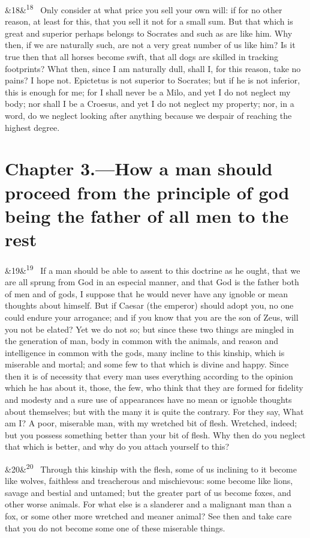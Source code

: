 \documentclass[12pt]{article}
\newcommand{\para}[1][]{\par\noindent\ifx&#1&\else\textsuperscript{\footnotesize #1}~\fi}
\begin{document}
\para[18] Only consider at what price you sell your own will: if for no other reason, at least for this, that you sell it not for a small sum. But that which is great and superior perhaps belongs to Socrates and such as are like him. Why then, if we are naturally such, are not a very great number of us like him? Is it true then that all horses become swift, that all dogs are skilled in tracking footprints? What then, since I am naturally dull, shall I, for this reason, take no pains? I hope not. Epictetus is not superior to Socrates; but if he is not inferior, this is enough for me; for I shall never be a Milo, and yet I do not neglect my body; nor shall I be a Croesus, and yet I do not neglect my property; nor, in a word, do we neglect looking after anything because we despair of reaching the highest degree.

\section*{Chapter 3.---How a man should proceed from the principle of god being the father of all men to the rest}

\para[19] If a man should be able to assent to this doctrine as he ought, that we are all sprung from God in an especial manner, and that God is the father both of men and of gods, I suppose that he would never have any ignoble or mean thoughts about himself. But if Caesar (the emperor) should adopt you, no one could endure your arrogance; and if you know that you are the son of Zeus, will you not be elated? Yet we do not so; but since these two things are mingled in the generation of man, body in common with the animals, and reason and intelligence in common with the gods, many incline to this kinship, which is miserable and mortal; and some few to that which is divine and happy. Since then it is of necessity that every man uses everything according to the opinion which he has about it, those, the few, who think that they are formed for fidelity and modesty and a sure use of appearances have no mean or ignoble thoughts about themselves; but with the many it is quite the contrary. For they say, What am I? A poor, miserable man, with my wretched bit of flesh. Wretched, indeed; but you possess something better than your bit of flesh. Why then do you neglect that which is better, and why do you attach yourself to this?

\para[20] Through this kinship with the flesh, some of us inclining to it become like wolves, faithless and treacherous and mischievous: some become like lions, savage and bestial and untamed; but the greater part of us become foxes, and other worse animals. For what else is a slanderer and a malignant man than a fox, or some other more wretched and meaner animal? See then and take care that you do not become some one of these miserable things.
\end{document}
